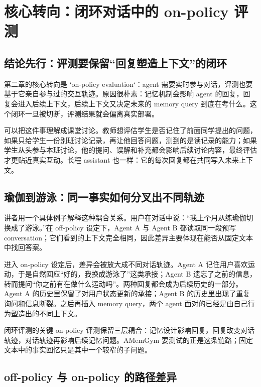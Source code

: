 \section{核心转向：闭环对话中的 on-policy 评测}

\subsection{结论先行：评测要保留“回复塑造上下文”的闭环}

第二章的核心转向是 `on-policy evaluation`：agent 需要实时参与对话，评测也要基于它亲自参与过的交互轨迹。原因很朴素：记忆机制会影响 agent 的回复，回复会进入后续上下文，后续上下文又决定未来的 memory query 到底在考什么。这个闭环一旦被切断，评测结果就会偏离真实部署。

可以把这件事理解成课堂讨论。教师想评估学生是否记住了前面同学提出的问题，如果只给学生一份别班讨论记录，再让他回答问题，测到的是读记录的能力；如果学生从头参与本班讨论，他的提问、误解和补充都会影响后续讨论内容，最终评估才更贴近真实互动。长程 assistant 也一样：它的每次回复都在共同写入未来上下文。

\subsection{瑜伽到游泳：同一事实如何分叉出不同轨迹}

讲者用一个具体例子解释这种耦合关系。用户在对话中说：“我上个月从练瑜伽切换成了游泳。”在 off-policy 设定下，Agent A 与 Agent B 都读取同一段预写 conversation；它们看到的上下文完全相同，因此差异主要体现在能否从固定文本中找回答案。

进入 on-policy 设定后，差异会被放大成不同对话轨迹。Agent A 记住用户喜欢运动，于是自然回应“好的，我换成游泳了”这类承接；Agent B 遗忘了之前的信息，转而提问“你之前有在做什么运动吗”。两种回复都会成为后续历史的一部分。Agent A 的历史里保留了对用户状态更新的承接；Agent B 的历史里出现了重复询问和信息断裂。之后再插入 memory query，两个 agent 面对的已经是由自己行为塑造出的不同上下文。

\begin{importantbox}{闭环评测的关键}
on-policy 评测保留三层耦合：记忆设计影响回复，回复改变对话轨迹，对话轨迹再影响后续记忆问题。AMemGym 要测试的正是这条链路；固定文本中的事实回忆只是其中一个较窄的子问题。
\end{importantbox}

\subsection{off-policy 与 on-policy 的路径差异}

